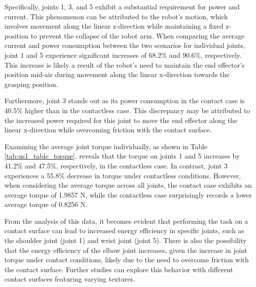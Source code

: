 \documentclass[report.tex]{subfiles}
\begin{document}
    Specifically, joints 1, 3, and 5 exhibit a substantial requirement for power and current. This phenomenon can be attributed to the robot's motion, which involves movement along the linear z-direction while maintaining a fixed z-position to prevent the collapse of the robot arm. When comparing the average current and power consumption between the two scenarios for individual joints, joint 1 and 5 experience significant increases of 68.2\% and 90.6\%, respectively. This increase is likely a result of the robot's need to maintain the end effector's position mid-air during movement along the linear x-direction towards the grasping position.
    
    Furthermore, joint 3 stands out as its power consumption in the contact case is 40.5\% higher than in the contactless case. This discrepancy may be attributed to the increased power required for this joint to move the end effector along the linear x-direction while overcoming friction with the contact surface.
    
    Examining the average joint torque individually, as shown in Table \ref{tab:us1_table_torque}, reveals that the torque on joints 1 and 5 increases by 41.2\% and 47.5\%, respectively, in the contactless case. In contrast, joint 3 experiences a 55.8\% decrease in torque under contactless conditions. However, when considering the average torque across all joints, the contact case exhibits an average torque of 1.9857 N, while the contactless case surprisingly records a lower average torque of 0.8256 N.
    
    From the analysis of this data, it becomes evident that performing the task on a contact surface can lead to increased energy efficiency in specific joints, such as the shoulder joint (joint 1) and wrist joint (joint 5). There is also the possibility that the energy efficiency of the elbow joint increases, given the increase in joint torque under contact conditions, likely due to the need to overcome friction with the contact surface. Further studies can explore this behavior with different contact surfaces featuring varying textures.
\end{document}
